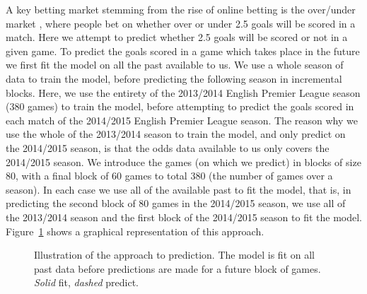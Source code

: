 \documentclass[11pt,a4paper]{article}
\begin{document}
A key betting market stemming from the rise of online betting is the 
over/under market \citep{betfair_2017, bethq_2017, Sportingindex_2017}, 
where people bet on whether over or under 2.5 goals 
will be scored in a match. Here we attempt to 
predict whether 2.5 goals will be scored or not in a given game.  
To predict the goals scored in a game which takes place in the 
future we first fit the model on all the past available to us. We 
use a whole season of data to train the 
model, before predicting the following season in incremental blocks. 
Here, we use the entirety of the 2013/2014 English Premier League 
season (380 games) to train the model, before attempting to predict 
the goals scored in each match of the 2014/2015 English Premier League 
season. The reason why we use the whole of the 2013/2014 season to 
train the model, and only predict on the 2014/2015 season, is that the 
odds data available to us only covers the 2014/2015 season. %
We introduce the games (on which we predict) in blocks of 
size 80, with a final block of 60 games to total 380 (the number of 
games over a season). In each case we use all of the available past 
to fit the model, that is, in predicting the second block of 80 games in 
the 2014/2015 season, we use all of the 2013/2014 season and the first 
block of the 2014/2015 season to fit the model. Figure~\ref{pic-window} 
shows a graphical representation of this approach.


\begin{figure}
\centering
{}
\caption{Illustration of the approach to prediction. The model is fit on all past data before predictions are made for a future block of games. \emph{Solid} fit, \emph{dashed} predict.} \label{pic-window}
\end{figure} 
\end{document}
